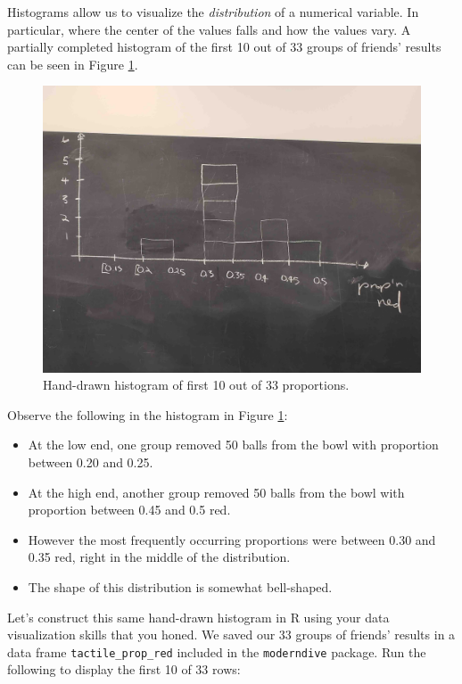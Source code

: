 \documentclass[
]{book}
\providecommand{\tightlist}{%
  \setlength{\itemsep}{0pt}\setlength{\parskip}{0pt}}
\begin{document}
Histograms allow us to visualize the \emph{distribution}  of a numerical variable. In particular, where the center of the values falls and how the values vary. A partially completed histogram of the first 10 out of 33 groups of friends' results can be seen in Figure \ref{fig:sampling-exercise-5}.

\begin{figure}
\includegraphics[width=0.8\linewidth]{images/sampling/balls/tactile_3_c} \caption{Hand-drawn histogram of first 10 out of 33 proportions.}\label{fig:sampling-exercise-5}
\end{figure}

Observe the following in the histogram in Figure \ref{fig:sampling-exercise-5}:

\begin{itemize}
\tightlist
\item
  At the low end, one group removed 50 balls from the bowl with proportion between 0.20 and 0.25.
\item
  At the high end, another group removed 50 balls from the bowl with proportion between 0.45 and 0.5 red.
\item
  However the most frequently occurring proportions were between 0.30 and 0.35 red, right in the middle of the distribution.
\item
  The shape of this distribution is somewhat bell-shaped.
\end{itemize}

Let's construct this same hand-drawn histogram in R using your data visualization skills that you honed. We saved our 33 groups of friends' results in a data frame \texttt{tactile\_prop\_red} included in the \texttt{moderndive} package. Run the following to display the first 10 of 33 rows:
\end{document}

